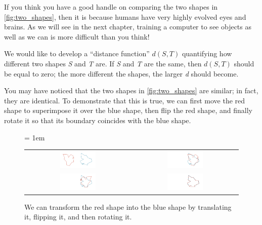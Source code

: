 If you think you have a good handle on comparing the two shapes in \autoref{fig:two_shapes}, then it is because humans have very highly evolved eyes and brains. As we will see in the next chapter, training a computer to see objects as well as we can is more difficult than you think!

We would like to develop a ``distance function'' $d(S, T)$ quantifying how different two shapes \textit{S} and \textit{T} are. If \textit{S} and \textit{T} are the same, then $d(S, T)$ should be equal to zero; the more different the shapes, the larger \textit{d} should become.

You may have noticed that the two shapes in \autoref{fig:two_shapes} are similar; in fact, they are identical. To demonstrate that this is true, we can first move the red shape to superimpose it over the blue shape, then flip the red shape, and finally rotate it so that its boundary coincides with the blue shape.

\begin{figure}[h]
	\centering
	\tabcolsep = 1em
	\mySfFamily
	\begin{tabular}{c c}
		\includegraphics[width = 0.35\textwidth]{../images/shape_transformation1.png} & \includegraphics[width = 0.35\textwidth]{../images/shape_transformation2.png} \\ \includegraphics[width = 0.35\textwidth]{../images/shape_transformation3.png} & \includegraphics[width = 0.35\textwidth]{../images/shape_transformation4.png} \\
	\end{tabular}
	\caption{We can transform the red shape into the blue shape by translating it, flipping it, and then rotating it.}
	\label{fig:shape_transformation}
\end{figure}

